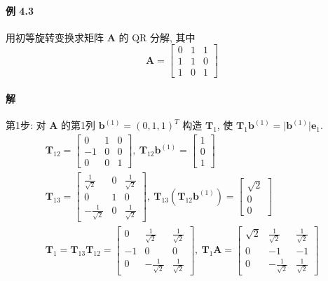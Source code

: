 \paragraph*{例 4.3} 用初等旋转变换求矩阵 $\bm{A}$ 的 QR 分解, 其中
$$
    \bm{A} = \begin{bmatrix}
        0 & 1 & 1 \\
        1 & 1 & 0 \\
        1 & 0 & 1
    \end{bmatrix}
$$

\paragraph*{解} 第1步: 对 $\bm{A}$ 的第1列 $\bm{b}^{(1)} = (0,1,1)^T$ 构造 $\bm{T}_1$, 使 $\bm{T}_1\bm{b}^{(1)} = \lvert \bm{b}^{(1)} \rvert \bm{e}_1$.
\begin{gather*}
    \bm{T}_{12} = \begin{bmatrix}
        0  & 1 & 0 \\
        -1 & 0 & 0 \\
        0  & 0 & 1
    \end{bmatrix}, \ \bm{T}_{12}\bm{b}^{(1)} = \begin{bmatrix}
        1 \\
        0 \\
        1
    \end{bmatrix} \\
    \bm{T}_{13} = \begin{bmatrix}
        \frac{1}{\sqrt{2}}  & 0 & \frac{1}{\sqrt{2}} \\
        0                   & 1 & 0                  \\
        -\frac{1}{\sqrt{2}} & 0 & \frac{1}{\sqrt{2}}
    \end{bmatrix}, \ \bm{T}_{13}(\bm{T}_{12}\bm{b}^{(1)}) = \begin{bmatrix}
        \sqrt{2} \\
        0        \\
        0
    \end{bmatrix} \\
    \bm{T}_1 = \bm{T}_{13}\bm{T}_{12} = \begin{bmatrix}
        0  & \frac{1}{\sqrt{2}}  & \frac{1}{\sqrt{2}} \\
        -1 & 0                   & 0                  \\
        0  & -\frac{1}{\sqrt{2}} & \frac{1}{\sqrt{2}}
    \end{bmatrix}, \ \bm{T}_1\bm{A} = \begin{bmatrix}
        \sqrt{2} & \frac{1}{\sqrt{2}}  & \frac{1}{\sqrt{2}} \\
        0        & -1                  & -1                 \\
        0        & -\frac{1}{\sqrt{2}} & \frac{1}{\sqrt{2}}
    \end{bmatrix}
\end{gather*}
